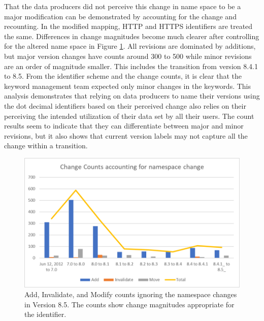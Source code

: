 That the data producers did not perceive this change in name space to be a major modification can be demonstrated by accounting for the change and recounting.
In the modified mapping, HTTP and HTTPS identifiers are treated the same.
Differences in change magnitudes become much clearer after controlling for the altered name space in Figure \ref{GCMDC2}.
All revisions are dominated by additions, but major version changes have counts around 300 to 500 while minor revisions are an order of magnitude smaller.
This includes the transition from version 8.4.1 to 8.5.
From the identifier scheme and the change counts, it is clear that the keyword management team expected only minor changes in the keywords.
This analysis demonstrates that relying on data producers to name their versions using the dot decimal identifiers based on their perceived change also relies on their perceiving the intended utilization of their data set by all their users.
The count results seem to indicate that they can differentiate between major and minor revisions, but it also shows that current version labels may not capture all the change within a transition.


\begin{figure}%
	\centering
	\includegraphics[scale=1]{figures/GCMDChart2.png}
	\caption{Add, Invalidate, and Modify counts ignoring the namespace changes in Version 8.5.  The counts show change magnitudes appropriate for the identifier.}
	\label{GCMDC2}
\end{figure}